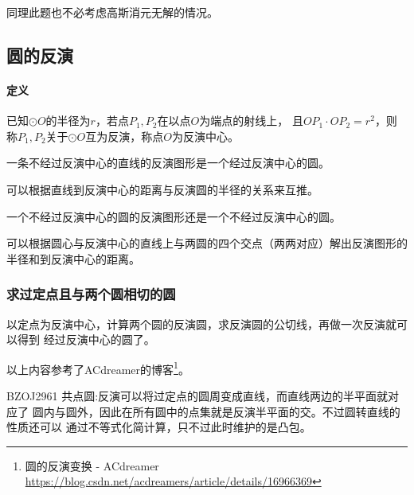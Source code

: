 同理此题也不必考虑高斯消元无解的情况。
\subsection{圆的反演}
\paragraph{定义} 已知$\odot O$的半径为$r$，若点$P_1,P_2$在以点$O$为端点的射线上，
且$OP_1\cdot OP_2=r^2$，则称$P_1,P_2$关于$\odot O$互为反演，称点$O$为反演中心。

\begin{property}
	一条不经过反演中心的直线的反演图形是一个经过反演中心的圆。
\end{property}
可以根据直线到反演中心的距离与反演圆的半径的关系来互推。

\begin{property}
	一个不经过反演中心的圆的反演图形还是一个不经过反演中心的圆。
\end{property}
可以根据圆心与反演中心的直线上与两圆的四个交点（两两对应）解出反演图形的
半径和到反演中心的距离。

\subsubsection{求过定点且与两个圆相切的圆}
以定点为反演中心，计算两个圆的反演圆，求反演圆的公切线，再做一次反演就可以得到
经过反演中心的圆了。

以上内容参考了ACdreamer的博客\footnote{
	圆的反演变换 - ACdreamer\\
	\url{https://blog.csdn.net/acdreamers/article/details/16966369}
}。

BZOJ2961 共点圆:反演可以将过定点的圆周变成直线，而直线两边的半平面就对应了
圆内与圆外，因此在所有圆中的点集就是反演半平面的交。不过圆转直线的性质还可以
通过不等式化简计算，只不过此时维护的是凸包。
